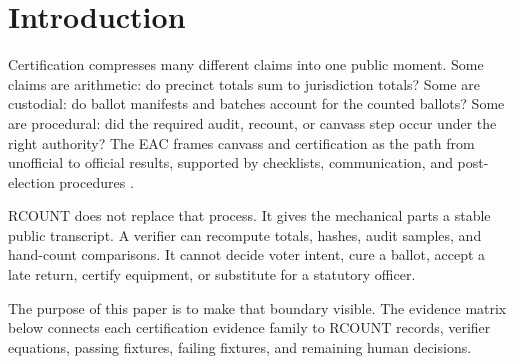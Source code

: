 \section{Introduction}

Certification compresses many different claims into one public moment. Some
claims are arithmetic: do precinct totals sum to jurisdiction totals? Some are
custodial: do ballot manifests and batches account for the counted ballots?
Some are procedural: did the required audit, recount, or canvass step occur
under the right authority? The EAC frames canvass and certification as the path
from unofficial to official results, supported by checklists, communication,
and post-election procedures \citep{eac-canvass-certification}.

RCOUNT does not replace that process. It gives the mechanical parts a stable
public transcript. A verifier can recompute totals, hashes, audit samples, and
hand-count comparisons. It cannot decide voter intent, cure a ballot, accept a
late return, certify equipment, or substitute for a statutory officer.

The purpose of this paper is to make that boundary visible. The evidence matrix
below connects each certification evidence family to RCOUNT records, verifier
equations, passing fixtures, failing fixtures, and remaining human decisions.
